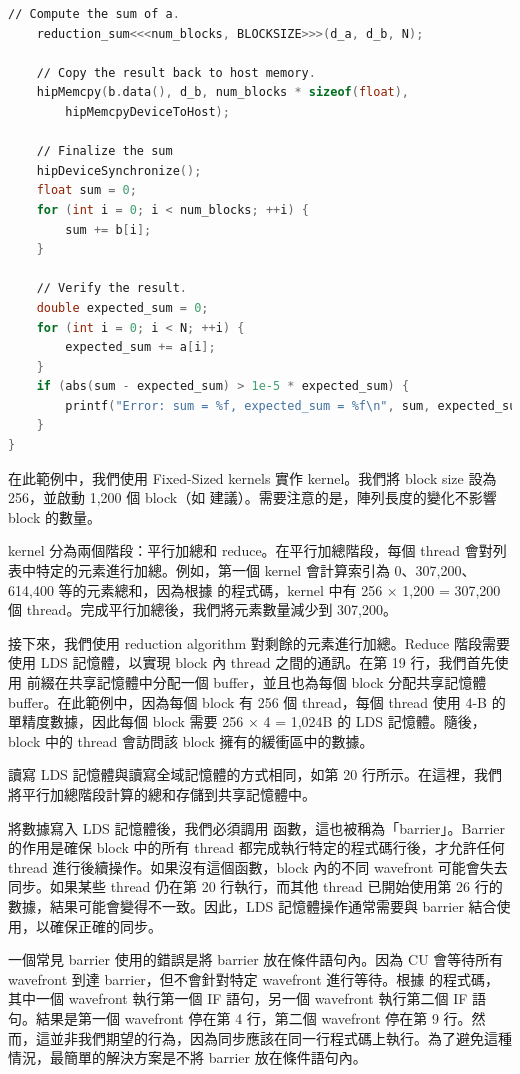 \begin{lstlisting}[language=C, caption={用 HIP 實作的程式，用於計算陣列中數字的總和。}, captionpos=t, label={lst:sum}]
    ∕∕ Compute the sum of a.
    reduction_sum<<<num_blocks, BLOCKSIZE>>>(d_a, d_b, N);

    ∕∕ Copy the result back to host memory.
    hipMemcpy(b.data(), d_b, num_blocks * sizeof(float),
        hipMemcpyDeviceToHost);

    ∕∕ Finalize the sum
    hipDeviceSynchronize();
    float sum = 0;
    for (int i = 0; i < num_blocks; ++i) {
        sum += b[i];
    }

    ∕∕ Verify the result.
    double expected_sum = 0;
    for (int i = 0; i < N; ++i) {
        expected_sum += a[i];
    }
    if (abs(sum - expected_sum) > 1e-5 * expected_sum) {
        printf("Error: sum = %f, expected_sum = %f\n", sum, expected_sum);
    }
}
\end{lstlisting}

在此範例中，我們使用 Fixed-Sized kernels 實作  kernel。我們將 block size 設為 256，並啟動 1,200 個 block（如  建議）。需要注意的是，陣列長度的變化不影響 block 的數量。

 kernel 分為兩個階段：平行加總和 reduce。在平行加總階段，每個 thread 會對列表中特定的元素進行加總。例如，第一個 kernel 會計算索引為 0、307,200、614,400 等的元素總和，因為根據  的程式碼，kernel 中有 256 × 1,200 = 307,200 個 thread。完成平行加總後，我們將元素數量減少到 307,200。

接下來，我們使用 reduction algorithm 對剩餘的元素進行加總。Reduce 階段需要使用 LDS 記憶體，以實現 block 內 thread 之間的通訊。在第 19 行，我們首先使用  前綴在共享記憶體中分配一個 buffer，並且也為每個 block 分配共享記憶體 buffer。在此範例中，因為每個 block 有 256 個 thread，每個 thread 使用 4-B 的單精度數據，因此每個 block 需要 256 × 4 = 1,024B 的 LDS 記憶體。隨後，block 中的 thread 會訪問該 block 擁有的緩衝區中的數據。

讀寫 LDS 記憶體與讀寫全域記憶體的方式相同，如第 20 行所示。在這裡，我們將平行加總階段計算的總和存儲到共享記憶體中。

將數據寫入 LDS 記憶體後，我們必須調用  函數，這也被稱為「barrier」。Barrier 的作用是確保 block 中的所有 thread 都完成執行特定的程式碼行後，才允許任何 thread 進行後續操作。如果沒有這個函數，block 內的不同 wavefront 可能會失去同步。如果某些 thread 仍在第 20 行執行，而其他 thread 已開始使用第 26 行的數據，結果可能會變得不一致。因此，LDS 記憶體操作通常需要與 barrier 結合使用，以確保正確的同步。

一個常見 barrier 使用的錯誤是將 barrier 放在條件語句內。因為 CU 會等待所有 wavefront 到達 barrier，但不會針對特定 wavefront 進行等待。根據  的程式碼，其中一個 wavefront 執行第一個 IF 語句，另一個 wavefront 執行第二個 IF 語句。結果是第一個 wavefront 停在第 4 行，第二個 wavefront 停在第 9 行。然而，這並非我們期望的行為，因為同步應該在同一行程式碼上執行。為了避免這種情況，最簡單的解決方案是不將 barrier 放在條件語句內。

